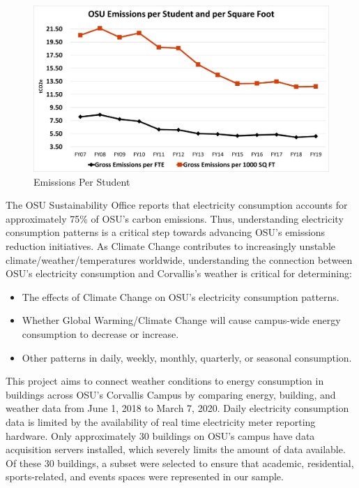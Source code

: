 \documentclass[
]{article}
\providecommand{\tightlist}{%
  \setlength{\itemsep}{0pt}\setlength{\parskip}{0pt}}
\begin{document}
\begin{figure}
\centering
\includegraphics{../documents/normalized1.jpg}
\caption{Emissions Per Student}
\end{figure}

The OSU Sustainability Office reports that electricity consumption
accounts for approximately 75\% of OSU's carbon emissions. Thus,
understanding electricity consumption patterns is a critical step
towards advancing OSU's emissions reduction initiatives. As Climate
Change contributes to increasingly unstable climate/weather/temperatures
worldwide, understanding the connection between OSU's electricity
consumption and Corvallis's weather is critical for determining:

\begin{itemize}
\tightlist
\item
  The effects of Climate Change on OSU's electricity consumption
  patterns.
\item
  Whether Global Warming/Climate Change will cause campus-wide energy
  consumption to decrease or increase.
\item
  Other patterns in daily, weekly, monthly, quarterly, or seasonal
  consumption.
\end{itemize}

This project aims to connect weather conditions to energy consumption in
buildings across OSU's Corvallis Campus by comparing energy, building,
and weather data from June 1, 2018 to March 7, 2020. Daily electricity
consumption data is limited by the availability of real time electricity
meter reporting hardware. Only approximately 30 buildings on OSU's
campus have data acquisition servers installed, which severely limits
the amount of data available. Of these 30 buildings, a subset were
selected to ensure that academic, residential, sports-related, and
events spaces were represented in our sample.
\end{document}
